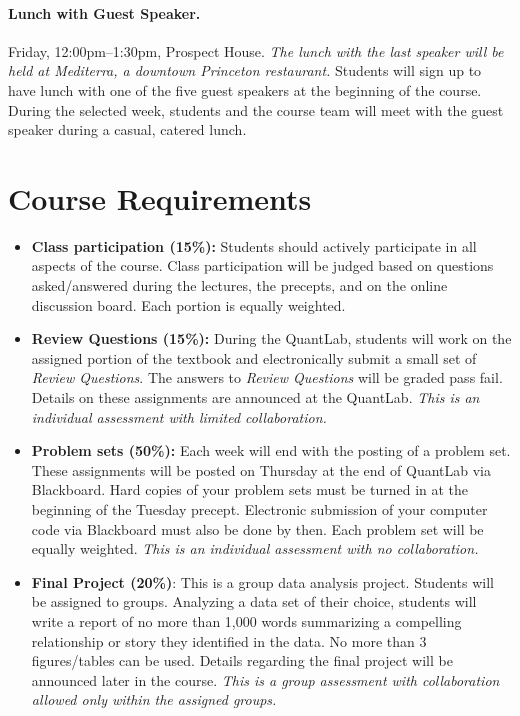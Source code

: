 \documentclass[11pt,letterpaper]{article}
\begin{document}
\paragraph{Lunch with Guest Speaker.} Friday, 12:00pm--1:30pm,
Prospect House.  \textit{The lunch with the last speaker will be held
  at Mediterra, a downtown Princeton restaurant.} Students will sign
up to have lunch with one of the five guest speakers at the beginning
of the course. During the selected week, students and the course team
will meet with the guest speaker during a casual, catered lunch.

\section*{Course Requirements}

\begin{itemize}
\item {\bf Class participation (15\%):} Students should actively
  participate in all aspects of the course.  Class participation will
  be judged based on questions asked/answered during the lectures, the
  precepts, and on the online discussion board.  Each portion is
  equally weighted.

\item {\bf Review Questions (15\%):} During the QuantLab, students
  will work on the assigned portion of the textbook and electronically
  submit a small set of {\it Review Questions}.  The answers to {\it
    Review Questions} will be graded pass fail.  Details on these
  assignments are announced at the QuantLab. \textit{This is an
    individual assessment with limited collaboration.}

\item {\bf Problem sets (50\%):} Each week will end with the posting
  of a problem set.  These assignments will be posted on Thursday at
  the end of QuantLab via Blackboard.  Hard copies of your problem
  sets must be turned in at the beginning of the Tuesday
  precept. Electronic submission of your computer code via Blackboard
  must also be done by then. Each problem set will be equally
  weighted. \textit{This is an individual assessment with no
    collaboration.}

\item {\bf Final Project (20\%)}: This is a group data analysis
  project. Students will be assigned to groups. Analyzing a data set
  of their choice, students will write a report of no more than 1,000
  words summarizing a compelling relationship or story they identified
  in the data.  No more than 3 figures/tables can be used.  Details
  regarding the final project will be announced later in the
  course. \textit{This is a group assessment with collaboration
    allowed only within the assigned groups.}

\end{itemize}
\end{document}
